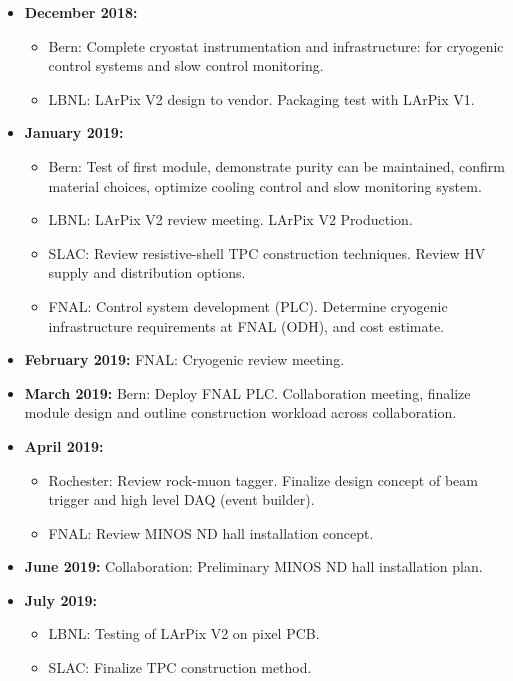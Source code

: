 \begin{itemize}
\item {\bf December 2018:}
\begin{itemize}
\item Bern: Complete cryostat instrumentation and infrastructure: for cryogenic control systems and slow control monitoring. 
\item LBNL: LArPix V2 design to vendor. Packaging test with LArPix V1.
\end{itemize}
\item {\bf January 2019:} 
\begin{itemize}
	\item Bern: Test of first module, demonstrate purity can be maintained, confirm material choices, optimize cooling control and slow monitoring system.   
	\item LBNL: LArPix V2 review meeting. LArPix V2 Production.
	\item SLAC: Review resistive-shell TPC construction techniques. Review HV supply and distribution options.   
	\item FNAL: Control system development (PLC). Determine cryogenic infrastructure requirements at FNAL (ODH), and cost 
	estimate.  
\end{itemize}
\item {\bf February 2019:} FNAL: Cryogenic review meeting.  
\item {\bf March 2019:} Bern: Deploy FNAL PLC. Collaboration meeting, finalize module design and outline construction workload across collaboration.    
\item {\bf April 2019:} 
\begin{itemize}
	\item Rochester: Review rock-muon tagger. Finalize design concept of beam trigger and high level DAQ (event builder). 
	\item FNAL: Review MINOS ND hall installation concept.  
\end{itemize}
\item {\bf June 2019:} Collaboration: Preliminary MINOS ND hall installation plan.
\item {\bf July 2019:} 
\begin{itemize}
	\item LBNL: Testing of LArPix V2 on pixel PCB.   
	\item SLAC: Finalize TPC construction method.
\end{itemize}

\end{itemize}

